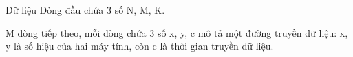Dữ liệu  
Dòng đầu chứa 3 số N, M, K.  

   M dòng tiếp theo, mỗi dòng chứa 3 số x, y, c mô tả một đường truyền dữ liệu: x, y là số hiệu của hai máy tính, còn c là thời gian truyền dữ liệu.